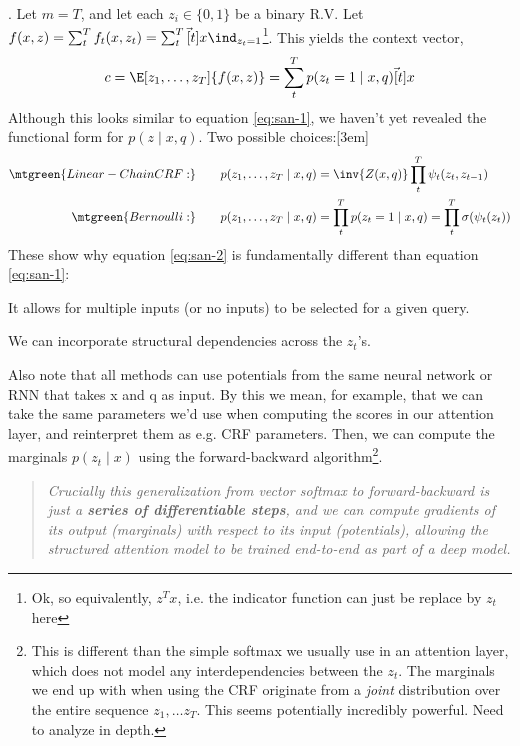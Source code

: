 \documentclass[11pt]{article}
\begin{document}
\myspace 
\p {}. Let $m = T$, and let each $z_i \in \{0, 1\}$ be a binary R.V. Let $f(x, z) = \sum_{t}^{T} f_t(x, z_t) = \sum_t^T \vec[t]{x} \ind_{z_t=1}$\footnote{Ok, so equivalently, $z^T x$, i.e. the indicator function can just be replace by $z_t$ here}. This yields the context vector,
\begin{align}
c = \E[z_1, \ldots, z_T]{f(x, z)} = \sum_t^T p(z_t = 1 \mid x, q) \vec[t]{x} \label{eq:san-2}
\end{align}
Although this looks similar to equation \ref{eq:san-1}, we haven't yet revealed the functional form for $p(z \mid x, q)$. Two possible choices:[3em]
\begin{align}
\mtgreen{Linear-Chain CRF:}&\qquad p(z_1, \ldots, z_T\mid x, q) = \inv{Z(x, q)} \prod_t^T \psi_t(z_t, z_{t-1}) \\
\mtgreen{Bernoulli:}&\qquad p(z_1,\ldots, z_T \mid x, q) = \prod_t^T p(z_t = 1 \mid x, q) = \prod_t^T \sigma(\psi_t(z_t))
\end{align}
These show why equation \ref{eq:san-2} is fundamentally different than equation \ref{eq:san-1}:
\begin{compactitem}
	\item It allows for multiple inputs (or no inputs) to be selected for a given query.
	\item We can incorporate structural dependencies across the $z_t$'s. 
\end{compactitem}
Also note that all methods can use potentials from the same neural network or RNN that takes x and q as input. By this we mean, for example, that we can take the same parameters we'd use when computing the scores in our attention layer, and reinterpret them as e.g. CRF parameters. Then, we can compute the marginals $p(z_t \mid x)$ using the forward-backward algorithm\footnote{This is different than the simple softmax we usually use in an attention layer, which does not model any interdependencies between the $z_t$. The marginals we end up with when using the CRF originate from a \textit{joint} distribution over the entire sequence $z_1, \ldots z_T$. This seems potentially incredibly powerful. Need to analyze in depth.}.
\vspace{-0.5em}
\begin{quote}
	{\small\itshape Crucially this generalization from vector softmax to forward-backward is just a \textbf{series of differentiable steps}, and we can compute gradients of its output (marginals) with respect to its input (potentials), allowing the structured attention model to be trained end-to-end as part of a deep model.
	}
\end{quote}
\end{document}
